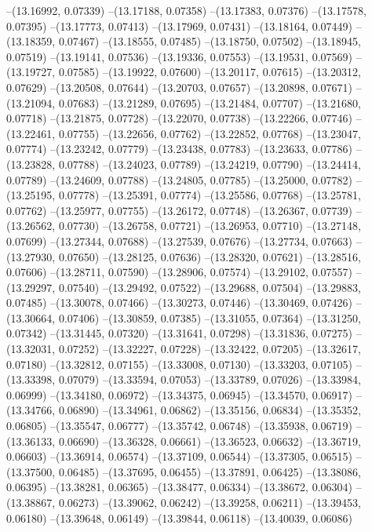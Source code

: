 --(13.16992, 0.07339)
--(13.17188, 0.07358)
--(13.17383, 0.07376)
--(13.17578, 0.07395)
--(13.17773, 0.07413)
--(13.17969, 0.07431)
--(13.18164, 0.07449)
--(13.18359, 0.07467)
--(13.18555, 0.07485)
--(13.18750, 0.07502)
--(13.18945, 0.07519)
--(13.19141, 0.07536)
--(13.19336, 0.07553)
--(13.19531, 0.07569)
--(13.19727, 0.07585)
--(13.19922, 0.07600)
--(13.20117, 0.07615)
--(13.20312, 0.07629)
--(13.20508, 0.07644)
--(13.20703, 0.07657)
--(13.20898, 0.07671)
--(13.21094, 0.07683)
--(13.21289, 0.07695)
--(13.21484, 0.07707)
--(13.21680, 0.07718)
--(13.21875, 0.07728)
--(13.22070, 0.07738)
--(13.22266, 0.07746)
--(13.22461, 0.07755)
--(13.22656, 0.07762)
--(13.22852, 0.07768)
--(13.23047, 0.07774)
--(13.23242, 0.07779)
--(13.23438, 0.07783)
--(13.23633, 0.07786)
--(13.23828, 0.07788)
--(13.24023, 0.07789)
--(13.24219, 0.07790)
--(13.24414, 0.07789)
--(13.24609, 0.07788)
--(13.24805, 0.07785)
--(13.25000, 0.07782)
--(13.25195, 0.07778)
--(13.25391, 0.07774)
--(13.25586, 0.07768)
--(13.25781, 0.07762)
--(13.25977, 0.07755)
--(13.26172, 0.07748)
--(13.26367, 0.07739)
--(13.26562, 0.07730)
--(13.26758, 0.07721)
--(13.26953, 0.07710)
--(13.27148, 0.07699)
--(13.27344, 0.07688)
--(13.27539, 0.07676)
--(13.27734, 0.07663)
--(13.27930, 0.07650)
--(13.28125, 0.07636)
--(13.28320, 0.07621)
--(13.28516, 0.07606)
--(13.28711, 0.07590)
--(13.28906, 0.07574)
--(13.29102, 0.07557)
--(13.29297, 0.07540)
--(13.29492, 0.07522)
--(13.29688, 0.07504)
--(13.29883, 0.07485)
--(13.30078, 0.07466)
--(13.30273, 0.07446)
--(13.30469, 0.07426)
--(13.30664, 0.07406)
--(13.30859, 0.07385)
--(13.31055, 0.07364)
--(13.31250, 0.07342)
--(13.31445, 0.07320)
--(13.31641, 0.07298)
--(13.31836, 0.07275)
--(13.32031, 0.07252)
--(13.32227, 0.07228)
--(13.32422, 0.07205)
--(13.32617, 0.07180)
--(13.32812, 0.07155)
--(13.33008, 0.07130)
--(13.33203, 0.07105)
--(13.33398, 0.07079)
--(13.33594, 0.07053)
--(13.33789, 0.07026)
--(13.33984, 0.06999)
--(13.34180, 0.06972)
--(13.34375, 0.06945)
--(13.34570, 0.06917)
--(13.34766, 0.06890)
--(13.34961, 0.06862)
--(13.35156, 0.06834)
--(13.35352, 0.06805)
--(13.35547, 0.06777)
--(13.35742, 0.06748)
--(13.35938, 0.06719)
--(13.36133, 0.06690)
--(13.36328, 0.06661)
--(13.36523, 0.06632)
--(13.36719, 0.06603)
--(13.36914, 0.06574)
--(13.37109, 0.06544)
--(13.37305, 0.06515)
--(13.37500, 0.06485)
--(13.37695, 0.06455)
--(13.37891, 0.06425)
--(13.38086, 0.06395)
--(13.38281, 0.06365)
--(13.38477, 0.06334)
--(13.38672, 0.06304)
--(13.38867, 0.06273)
--(13.39062, 0.06242)
--(13.39258, 0.06211)
--(13.39453, 0.06180)
--(13.39648, 0.06149)
--(13.39844, 0.06118)
--(13.40039, 0.06086)
